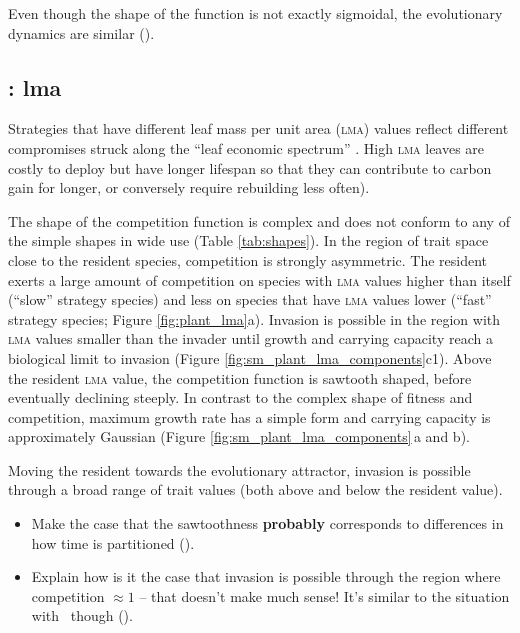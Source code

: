 \documentclass[a4paper,11pt]{article}
\begin{document}
Even though the shape of the function is not exactly sigmoidal, the
evolutionary dynamics are similar (\TODO).

\subsection{\plant: lma}
Strategies that have different leaf mass per unit area (\textsc{lma})
values reflect different compromises struck along the ``leaf economic spectrum''
\citep{Reich-1997,Wright-2004}.  High \textsc{lma} leaves are
costly to deploy but have longer lifespan so that they can contribute
to carbon gain for longer, or conversely require rebuilding less
often).

The shape of the competition function is complex and does not conform
to any of the simple shapes in wide use (Table \ref{tab:shapes}).
In the region of trait space close to the resident species,
competition is strongly asymmetric. The resident exerts a large amount
of competition on species with \textsc{lma} values higher than itself (``slow''
strategy species) and less on species that have \textsc{lma} values lower
(``fast'' strategy species; Figure \ref{fig:plant_lma}a).  Invasion is
possible in the region with \textsc{lma} values smaller than the invader until
growth and carrying capacity reach a biological limit to invasion
(Figure \ref{fig:sm_plant_lma_components}c1).
%
Above the resident \textsc{lma} value, the competition function is sawtooth
shaped, before eventually declining steeply.
%
In contrast to the complex shape of fitness and competition, maximum
growth rate has a simple form and carrying capacity is approximately
Gaussian (Figure \ref{fig:sm_plant_lma_components}\,a and b).

Moving the resident towards the evolutionary attractor, invasion is
possible through a broad range of trait values (both above and below
the resident value).
\begin{itemize}
\item Make the case that the sawtoothness \textbf{probably} corresponds to
  differences in how time is partitioned (\TODO).

\item Explain how is it the case that invasion is possible through the
  region where competition $\approx 1$ -- that doesn't make much sense!
  It's similar to the situation with \hmat\ though (\TODO).
\end{itemize}
\end{document}

